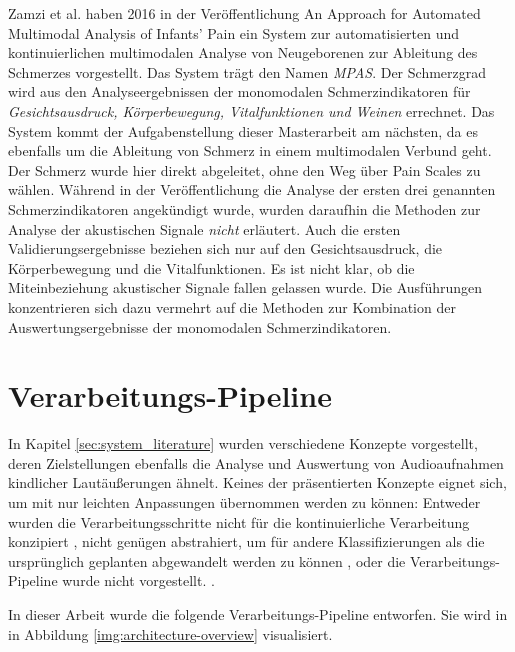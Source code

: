 Zamzi et al.  haben 2016 in der Veröffentlichung \glqq An Approach for Automated Multimodal Analysis of Infants' Pain\grqq{} \cite{zamziMultimodal} ein System zur automatisierten und kontinuierlichen multimodalen Analyse von Neugeborenen zur Ableitung des Schmerzes vorgestellt. Das System trägt den Namen \emph{MPAS}. Der Schmerzgrad wird aus den Analyseergebnissen der monomodalen Schmerzindikatoren für \emph{Gesichtsausdruck, Körperbewegung, Vitalfunktionen und Weinen} errechnet. Das System kommt der Aufgabenstellung dieser Masterarbeit am nächsten, da es ebenfalls um die Ableitung von Schmerz in einem multimodalen Verbund geht. Der Schmerz wurde hier \glqq direkt\grqq{} abgeleitet, ohne den Weg über Pain Scales zu wählen. Während in der Veröffentlichung die Analyse der ersten drei genannten Schmerzindikatoren angekündigt wurde, wurden daraufhin die Methoden zur Analyse der akustischen Signale \emph{nicht} erläutert. Auch die ersten Validierungsergebnisse beziehen sich nur auf den Gesichtsausdruck, die Körperbewegung und die Vitalfunktionen. Es ist nicht klar, ob die Miteinbeziehung akustischer Signale fallen gelassen wurde. Die Ausführungen konzentrieren sich dazu vermehrt auf die Methoden zur Kombination der Auswertungsergebnisse der monomodalen Schmerzindikatoren.

\section{Verarbeitungs-Pipeline}
\label{sec:pipeline}

In Kapitel \ref{sec:system_literature} wurden verschiedene Konzepte vorgestellt, deren Zielstellungen ebenfalls die Analyse und Auswertung von Audioaufnahmen kindlicher Lautäußerungen ähnelt. Keines der präsentierten Konzepte eignet sich, um mit nur leichten Anpassungen übernommen werden zu können: Entweder wurden die Verarbeitungsschritte nicht für die kontinuierliche Verarbeitung konzipiert \cite{class_abdulaziz} \cite{comparisonOfLearning} \cite{cry_thesis}, nicht genügen abstrahiert, um für andere Klassifizierungen als die ursprünglich geplanten abgewandelt werden zu können \cite{cohenCry}, oder die Verarbeitungs-Pipeline wurde nicht vorgestellt. \cite{palEmotion} \cite{zamziMultimodal}.

In dieser Arbeit wurde die folgende Verarbeitungs-Pipeline entworfen. Sie wird in in Abbildung \ref{img:architecture-overview} visualisiert. 


